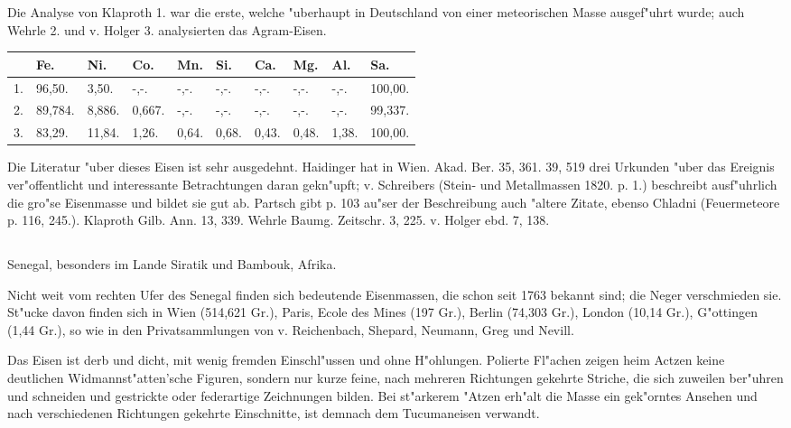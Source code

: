 \documentclass[a4paper, 11pt, oneside]{article}
\begin{document}
Die Analyse von Klaproth 1. war die erste, welche "uberhaupt in Deutschland von einer meteorischen Masse ausgef"uhrt wurde; auch Wehrle 2. und v. Holger 3. analysierten das Agram-Eisen.
\begin{table}[H]
    \centering\swabfamily\Large
    \begin{tabular}{p{3mm} l l l l p{5mm} p{5mm} p{5mm} l l}
         & Fe. & Ni. & Co. & Mn. & Si. & Ca. & Mg. & Al. & Sa. \\ \hline
        1. & 96,50. & 3,50. & -,-. & -,-. & -,-. & -,-. & -,-. & -,-. & 100,00. \\
        2. & 89,784. & 8,886. & 0,667. & -,-. & -,-. & -,-. & -,-. & -,-. & 99,337. \\
        3. & 83,29. & 11,84. & 1,26. & 0,64. & 0,68. & 0,43. & 0,48. & 1,38. & 100,00. \\
    \end{tabular}
\end{table}

\normalsize
Die Literatur "uber dieses Eisen ist sehr ausgedehnt. Haidinger hat in Wien. Akad. Ber. 35, 361. 39, 519 drei Urkunden "uber das Ereignis ver"offentlicht und interessante Betrachtungen daran gekn"upft; v. Schreibers (Stein- und Metallmassen 1820. p. 1.) beschreibt ausf"uhrlich die gro"se Eisenmasse und bildet sie gut ab. Partsch gibt p. 103 au"ser der Beschreibung auch "altere Zitate, ebenso Chladni (Feuermeteore p. 116, 245.). Klaproth Gilb. Ann. 13, 339. Wehrle Baumg. Zeitschr. 3, 225. v. Holger ebd. 7, 138.

\subsection{}
\LARGE
\paragraph{}
Senegal, besonders im Lande Siratik und Bambouk, Afrika.

Nicht weit vom rechten Ufer des Senegal finden sich bedeutende Eisenmassen, die schon seit 1763 bekannt sind; die Neger verschmieden sie. St"ucke davon finden sich in Wien (514,621 Gr.), Paris, Ecole des Mines (197 Gr.), Berlin (74,303 Gr.), London (10,14 Gr.), G"ottingen (1,44 Gr.), so wie in den Privatsammlungen von v. Reichenbach, Shepard, Neumann, Greg und Nevill.

Das Eisen ist derb und dicht, mit wenig fremden Einschl"ussen und ohne H"ohlungen. Polierte Fl"achen zeigen heim Actzen keine deutlichen Widmannst"atten'sche Figuren, sondern nur kurze feine, nach mehreren Richtungen gekehrte Striche, die sich zuweilen ber"uhren und schneiden und gestrickte oder federartige Zeichnungen bilden. Bei st"arkerem "Atzen erh"alt die Masse ein gek"orntes Ansehen und nach verschiedenen Richtungen gekehrte Einschnitte, ist demnach dem Tucumaneisen verwandt.
\end{document}
